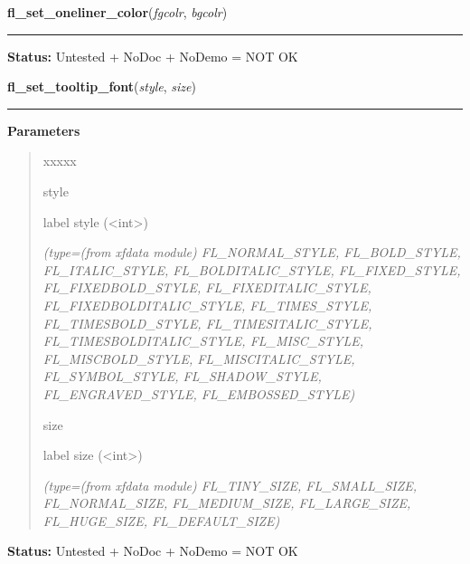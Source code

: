\hspace{.8\funcindent}\begin{boxedminipage}{\funcwidth}

    \raggedright \textbf{fl\_set\_oneliner\_color}(\textit{fgcolr}, \textit{bgcolr})

    \vspace{-1.5ex}

    \rule{\textwidth}{0.5\fboxrule}
\setlength{\parskip}{2ex}
\setlength{\parskip}{1ex}
\textbf{Status:} Untested + NoDoc + NoDemo = NOT OK



    \end{boxedminipage}

    \label{xformslib:library:fl_set_tooltip_font}

    \vspace{0.5ex}

\hspace{.8\funcindent}\begin{boxedminipage}{\funcwidth}

    \raggedright \textbf{fl\_set\_tooltip\_font}(\textit{style}, \textit{size})

    \vspace{-1.5ex}

    \rule{\textwidth}{0.5\fboxrule}
\setlength{\parskip}{2ex}
\setlength{\parskip}{1ex}
      \textbf{Parameters}
      \vspace{-1ex}

      \begin{quote}
        \begin{Ventry}{xxxxx}

          \item[style]

          label style ({\textless}int{\textgreater})

            {\it (type=(from xfdata module) FL\_NORMAL\_STYLE, FL\_BOLD\_STYLE, FL\_ITALIC\_STYLE,
FL\_BOLDITALIC\_STYLE, FL\_FIXED\_STYLE, FL\_FIXEDBOLD\_STYLE, 
FL\_FIXEDITALIC\_STYLE, FL\_FIXEDBOLDITALIC\_STYLE, FL\_TIMES\_STYLE, 
FL\_TIMESBOLD\_STYLE, FL\_TIMESITALIC\_STYLE, FL\_TIMESBOLDITALIC\_STYLE, 
FL\_MISC\_STYLE, FL\_MISCBOLD\_STYLE, FL\_MISCITALIC\_STYLE, 
FL\_SYMBOL\_STYLE, FL\_SHADOW\_STYLE, FL\_ENGRAVED\_STYLE, 
FL\_EMBOSSED\_STYLE)}

          \item[size]

          label size ({\textless}int{\textgreater})

            {\it (type=(from xfdata module) FL\_TINY\_SIZE, FL\_SMALL\_SIZE, FL\_NORMAL\_SIZE, 
FL\_MEDIUM\_SIZE, FL\_LARGE\_SIZE, FL\_HUGE\_SIZE, FL\_DEFAULT\_SIZE)}

        \end{Ventry}

      \end{quote}

\textbf{Status:} Untested + NoDoc + NoDemo = NOT OK



    \end{boxedminipage}

